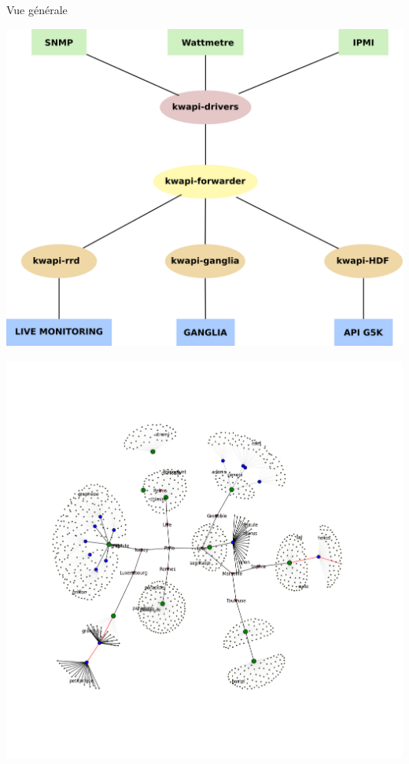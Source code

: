 \documentclass{beamer}
\begin{document}
\begin{frame}{Vue générale}
\begin{minipage}{0.47\linewidth}
\includegraphics[width=\linewidth]{Kwapi_archi.png}
\end{minipage}
\hfill
\begin{minipage}{0.47\linewidth}
\includegraphics[width=\linewidth]{topo5k.png}
\end{minipage}
\end{frame}
\end{document}

